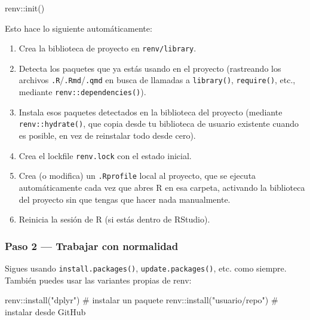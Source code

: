 \documentclass[
  man,
  floatsintext,
  longtable,
  a4paper,
  nolmodern,
  notxfonts,
  notimes,
  12pt,
  colorlinks=true,linkcolor=blue,citecolor=blue,urlcolor=blue]{apa7}
\newenvironment{Shaded}{\begin{snugshade}}{\end{snugshade}}
\newcommand{\CommentTok}[1]{\textcolor[rgb]{0.37,0.37,0.37}{#1}}
\newcommand{\FunctionTok}[1]{\textcolor[rgb]{0.28,0.35,0.67}{#1}}
\newcommand{\NormalTok}[1]{\textcolor[rgb]{0.00,0.23,0.31}{#1}}
\newcommand{\SpecialCharTok}[1]{\textcolor[rgb]{0.37,0.37,0.37}{#1}}
\newcommand{\StringTok}[1]{\textcolor[rgb]{0.13,0.47,0.30}{#1}}
\providecommand{\tightlist}{%
  \setlength{\itemsep}{0pt}\setlength{\parskip}{0pt}}
\begin{document}
\begin{Shaded}
\begin{Highlighting}[]
\NormalTok{renv}\SpecialCharTok{::}\FunctionTok{init}\NormalTok{()}
\end{Highlighting}
\end{Shaded}

Esto hace lo siguiente automáticamente:

\begin{enumerate}
\def\labelenumi{\arabic{enumi}.}
\tightlist
\item
  Crea la biblioteca de proyecto en \texttt{renv/library}.
\item
  Detecta los paquetes que ya estás usando en el proyecto (rastreando
  los archivos \texttt{.R}/\texttt{.Rmd}/\texttt{.qmd} en busca de
  llamadas a \texttt{library()}, \texttt{require()}, etc., mediante
  \texttt{renv::dependencies()}).
\item
  Instala esos paquetes detectados en la biblioteca del proyecto
  (mediante \texttt{renv::hydrate()}, que copia desde tu biblioteca de
  usuario existente cuando es posible, en vez de reinstalar todo desde
  cero).
\item
  Crea el lockfile \texttt{renv.lock} con el estado inicial.
\item
  Crea (o modifica) un \texttt{.Rprofile} local al proyecto, que se
  ejecuta automáticamente cada vez que abres R en esa carpeta, activando
  la biblioteca del proyecto sin que tengas que hacer nada manualmente.
\item
  Reinicia la sesión de R (si estás dentro de RStudio).
\end{enumerate}

\subsubsection{Paso 2 --- Trabajar con
normalidad}\label{paso-2-trabajar-con-normalidad}

Sigues usando \texttt{install.packages()}, \texttt{update.packages()},
etc. como siempre. También puedes usar las variantes propias de renv:

\begin{Shaded}
\begin{Highlighting}[]
\NormalTok{renv}\SpecialCharTok{::}\FunctionTok{install}\NormalTok{(}\StringTok{"dplyr"}\NormalTok{)          }\CommentTok{\# instalar un paquete}
\NormalTok{renv}\SpecialCharTok{::}\FunctionTok{install}\NormalTok{(}\StringTok{"usuario/repo"}\NormalTok{)   }\CommentTok{\# instalar desde GitHub}
\end{Highlighting}
\end{Shaded}
\end{document}
